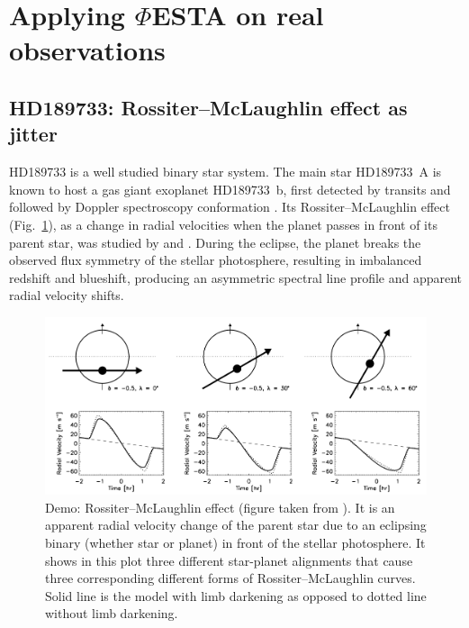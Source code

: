 \pagebreak
\section{Applying $\mathit{\Phi}$ESTA on real observations}
\label{\thesection}
\label{sec:observation}

\subsection{HD189733: Rossiter–McLaughlin effect as jitter}
\label{sec:HD189733}

HD189733 is a well studied binary star system. The main star HD189733~A is known to host a gas giant exoplanet HD189733~b, first detected by transits and followed by Doppler spectroscopy conformation \cite{Bouchy2005ELODIE}. Its Rossiter–McLaughlin effect (Fig.~\ref{fig:rm-effect}), as a change in radial velocities when the planet passes in front of its parent star, was studied by \cite{Cochran2006} and \cite{Triaud2009}. During the eclipse, the planet breaks the observed flux symmetry of the stellar photosphere, resulting in imbalanced redshift and blueshift, producing an asymmetric spectral line profile and apparent radial velocity shifts.

\begin{figure}[htbp]
\centering
\includegraphics[width = 0.80 \linewidth]
{./Figures/Methods/rmeffect.png}
\caption[Demo: Rossiter–McLaughlin effect]
{Demo: Rossiter–McLaughlin effect (figure taken from \cite{Gaudi2007}). It is an apparent radial velocity change of the parent star due to an eclipsing binary (whether star or planet) in front of the stellar photosphere. It shows in this plot three different star-planet alignments that cause three corresponding different forms of Rossiter–McLaughlin curves. Solid line is the model with limb darkening as opposed to dotted line without limb darkening.}
\label{fig:rm-effect}
\end{figure} 

